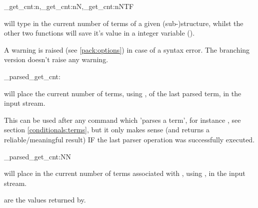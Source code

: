 \documentclass[10pt]{article}
\begin{document}
\begin{codedescribe}{\starray_get_cnt:n,\starray_get_cnt:nN,\starray_get_cnt:nNTF}
\begin{codesyntax}%
\end{codesyntax}
 will type in the current number of terms of a given (sub-)structure, whilst the other two functions will save it's value in a integer variable ().
\end{codedescribe}
\begin{tsremark}
A warning is raised (see \ref{pack:options}) in case of a  syntax error. The branching version doesn't raise any warning.
\end{tsremark}

\begin{codedescribe}[code,EXP,new=2023/05/20]{\starray_parsed_get_cnt:}
\begin{codesyntax}%
\end{codesyntax}
 will place the current number of terms, using , of the last parsed term, in the input stream.
\end{codedescribe}
\begin{tsremark}
This can be used after any command which 'parses a term', for instance , see section \ref{conditionals:terms}, but it only makes sense (and returns a reliable/meaningful result) IF the last parser operation was successfully executed.
\end{tsremark}

\begin{codedescribe}[code,EXP,new=2023/11/28]{\starray_parsed_get_cnt:NN}
\begin{codesyntax}%
\end{codesyntax}
 will place in the current number of terms associated with ,  using , in the input stream.
\end{codedescribe}
\begin{tsremark}
 are the values returned by\break  {}.
\end{tsremark}
\end{document}
